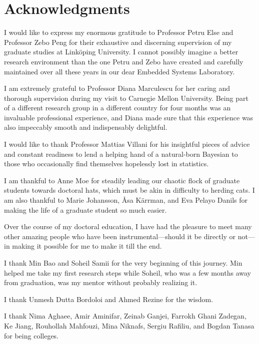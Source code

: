 \chapter*{Acknowledgments}
\newcommand\person[2]{#2 #1}

I would like to express my enormous gratitude to Professor \person{Else}{Petru}
and Professor \person{Peng}{Zebo} for their exhaustive and discerning
supervision of my graduate studies at Linköping University. I cannot possibly
imagine a better research environment than the one Petru and Zebo have created
and carefully maintained over all these years in our dear Embedded Systems
Laboratory.

I am extremely grateful to Professor \person{Marculescu}{Diana} for her caring
and thorough supervision during my visit to Carnegie Mellon University. Being
part of a different research group in a different country for four months was an
invaluable professional experience, and Diana made sure that this experience was
also impeccably smooth and indispensably delightful.

I would like to thank Professor \person{Villani}{Mattias} for his insightful
pieces of advice and constant readiness to lend a helping hand of a natural-born
Bayesian to those who occasionally find themselves hopelessly lost in
statistics.

I am thankful to \person{Moe}{Anne} for steadily leading our chaotic flock of
graduate students towards doctoral hats, which must be akin in difficulty to
herding cats. I am also thankful to \person{Johansson}{Marie},
\person{Kärrman}{Åsa}, and \person{Pelayo Danils}{Eva} for making the life of a
graduate student so much easier.

Over the course of my doctoral education, I have had the pleasure to meet many
other amazing people who have been instrumental---should it be directly or
not---in making it possible for me to make it till the end.

I thank \person{Bao}{Min} and \person{Samii}{Soheil} for the very beginning of
this journey. Min helped me take my first research steps while Soheil, who was a
few months away from graduation, was my mentor without probably realizing it.

I thank
\person{Dutta Bordoloi}{Unmesh} and
\person{Rezine}{Ahmed}
for the wisdom.

I thank
\person{Aghaee}{Nima},
\person{Aminifar}{Amir},
\person{Ganjei}{Zeinab},
\person{Ghani Zadegan}{Farrokh},
\person{Jiang}{Ke},
\person{Mahfouzi}{Rouhollah},
\person{Niknafs}{Mina},
\person{Rafiliu}{Sergiu}, and
\person{Tanasa}{Bogdan}
for being colleges.

